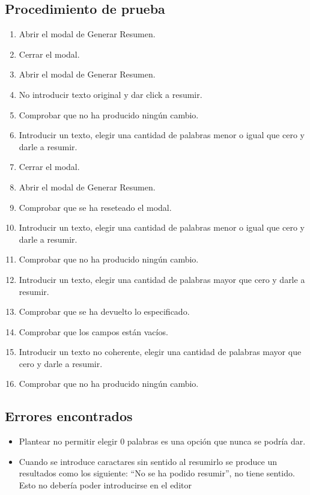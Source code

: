 \subsection{Procedimiento de prueba}
\label{procedimientoPruebas:resumen}
\begin{enumerate}
    \item Abrir el modal de Generar Resumen.
    \item Cerrar el modal.
    \item Abrir el modal de Generar Resumen.
    \item No introducir texto original y dar click a resumir.
    \item Comprobar que no ha producido ningún cambio.
    \item Introducir un texto, elegir una cantidad de palabras menor o igual que cero y darle a resumir.
    \item Cerrar el modal.
    \item Abrir el modal de Generar Resumen.
    \item Comprobar que se ha reseteado el modal.
    \item Introducir un texto, elegir una cantidad de palabras menor o igual que cero y darle a resumir.
    \item Comprobar que no ha producido ningún cambio.
    \item Introducir un texto, elegir una cantidad de palabras mayor que cero y darle a resumir.
    \item Comprobar que se ha devuelto lo especificado.
    \item Comprobar que los campos están vacíos.
    \item Introducir un texto no coherente, elegir una cantidad de palabras mayor que cero y darle a resumir.
    \item Comprobar que no ha producido ningún cambio.

\end{enumerate}

\subsection{Errores encontrados}
\label{errores:resumen}
\begin{itemize}
    \item Plantear no permitir elegir 0 palabras es una opción que nunca se podría dar.
    \item Cuando se introduce caractares sin sentido al resumirlo se produce un resultados como los siguiente: ``No se ha podido resumir'', no tiene sentido. Esto no debería poder introducirse en el editor
\end{itemize}

